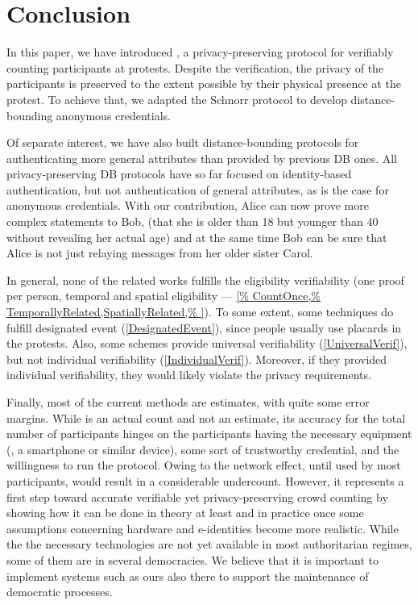 \section{Conclusion}%
\label{Conclusion}

In this paper, we have introduced \PRIVO, a privacy-preserving protocol for verifiably counting participants at protests. 
Despite the verification, the privacy of the participants is preserved to the extent possible by their physical presence at the protest. 
To achieve that, we adapted the Schnorr protocol to develop distance-bounding anonymous credentials. 

Of separate interest, we have also built distance-bounding protocols for authenticating more general attributes than provided by previous \ac{DB} ones.
All privacy-preserving \ac{DB} protocols have so far focused on identity-based authentication, but not authentication of general attributes, as is the case for anonymous credentials.
With our contribution, Alice can now prove more complex statements to Bob, (\eg  that she is older than 18 but younger than 40 without revealing her actual age) and at the same time Bob can be sure that Alice is not just relaying messages from her older sister Carol.

In general, none of the related works fulfills the eligibility
verifiability (one proof per person, temporal and spatial eligibility ---
\cref{%
  CountOnce,%
  TemporallyRelated,SpatiallyRelated,%
}).
To some extent, some techniques do fulfill designated event (\cref{DesignatedEvent}), since people usually use placards in the protests.
Also, some schemes provide universal verifiability (\cref{UniversalVerif}), but not individual verifiability (\cref{IndividualVerif}).
Moreover, if they provided individual verifiability, they would likely violate the privacy requirements.

Finally, most of the current methods are estimates, with quite some error margins. 
While \PRIVO is an actual count and not an estimate, its accuracy for the total number of participants hinges on the participants having the necessary equipment (\ie, a smartphone or similar device), some sort of trustworthy credential, and the willingness to run the protocol. 
Owing to the network effect, until used by most participants, \PRIVO would result in a considerable undercount. 
However, it represents a first step toward accurate verifiable yet privacy-preserving crowd counting by showing how it can be done in theory at least and in practice once some assumptions concerning hardware and e-identities become more realistic. 
While the the necessary technologies are not yet available in most authoritarian regimes, some of them are in several democracies. We believe that it is important to implement systems such as ours also there to support the maintenance of democratic processes.

